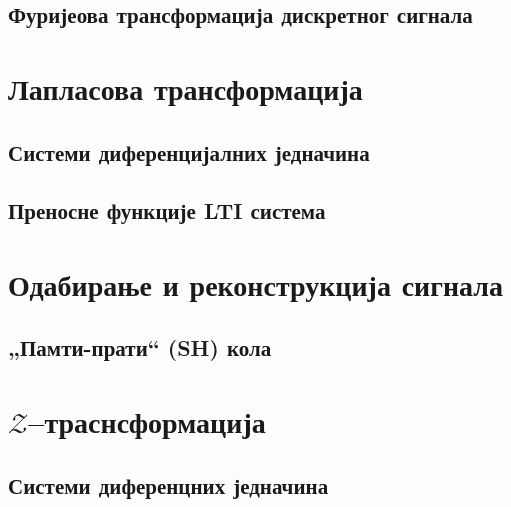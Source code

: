 \setcounter{fid}{0}
\graphicspath{{./3_furijeove_tranformacije/1_CT/}}
\noindent

\vspace*{\ProblemSep}
\subsection{Фуријеова трансформација дискретног сигнала}
\section{Лапласова трансформација}
\subsection{Системи диференцијалних једначина}

\setcounter{fid}{0}
\graphicspath{{./4_laplasova_transformacija/2_sistemi_dif_jna/}}
\noindent

\vspace*{\ProblemSep}
\subsection{Преносне функције LTI система}

\setcounter{fid}{0}
\graphicspath{{./4_laplasova_transformacija/3_fje_prenosa/}}
\noindent

\vspace*{\ProblemSep}
\section{Одабирање и реконструкција сигнала}
\subsection{„Памти-прати“ (SH) кола}

\setcounter{fid}{0}
\graphicspath{{./5_odabiranje/1_kola/}}
\noindent

\vspace*{\ProblemSep}
\section{$\mathcal{Z}$--траснсформација}
\subsection{Системи диференцних једначина}

\setcounter{fid}{0}
\graphicspath{{./6_z_transformacija/2_sistemi/}}
\noindent

\vspace*{\ProblemSep}
\appendix
\appendix
\graphicspath{{./100_appendix/}}



